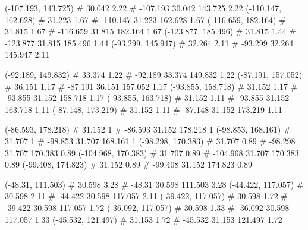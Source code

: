 \documentclass[a4paper,openbib,10pt]{article}
\newenvironment{treegraph}{\begin{graph}}{\end{graph}}
\begin{document}
\begin{treegraph}
  (-107.193, 143.725) #     30.042    2.22
   #    -107.193    30.042    143.725    2.22
  (-110.147, 162.628) #     31.223    1.67
   #    -110.147    31.223    162.628    1.67
  (-116.659, 182.164) #     31.815    1.67
   #    -116.659    31.815    182.164    1.67
  (-123.877, 185.496) #     31.815    1.44
   #    -123.877    31.815    185.496    1.44
  (-93.299, 145.947) #     32.264    2.11
   #    -93.299    32.264    145.947    2.11

  (-92.189, 149.832) #     33.374    1.22
   #    -92.189    33.374    149.832    1.22
  (-87.191, 157.052) #     36.151    1.17
   #    -87.191    36.151    157.052    1.17
  (-93.855, 158.718) #     31.152    1.17
   #    -93.855    31.152    158.718    1.17
  (-93.855, 163.718) #     31.152    1.11
   #    -93.855    31.152    163.718    1.11
  (-87.148, 173.219) #     31.152    1.11
   #    -87.148    31.152    173.219    1.11

  (-86.593, 178.218) #     31.152    1
   #    -86.593    31.152    178.218    1
  (-98.853, 168.161) #     31.707    1
   #    -98.853    31.707    168.161    1
  (-98.298, 170.383) #     31.707    0.89
   #    -98.298    31.707    170.383    0.89
  (-104.968, 170.383) #     31.707    0.89
   #    -104.968    31.707    170.383    0.89
  (-99.408, 174.823) #     31.152    0.89
   #    -99.408    31.152    174.823    0.89

  (-48.31, 111.503) #     30.598    3.28
   #    -48.31    30.598    111.503    3.28
  (-44.422, 117.057) #     30.598    2.11
   #    -44.422    30.598    117.057    2.11
  (-39.422, 117.057) #     30.598    1.72
   #    -39.422    30.598    117.057    1.72
  (-36.092, 117.057) #     30.598    1.33
   #    -36.092    30.598    117.057    1.33
  (-45.532, 121.497) #     31.153    1.72
   #    -45.532    31.153    121.497    1.72


\end{treegraph}
\end{document}
